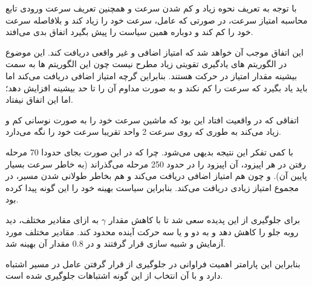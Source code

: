 با توجه به تعریف نحوه زیاد و کم شدن سرعت و همچنین تعریف سرعت ورودی تابع محاسبه امتیاز سرعت، در صورتی که عامل، سرعت خود را زیاد کند و بلافاصله سرعت خود را کم کند و دوباره همین سیاست را پیش بگیرد اتفاق بدی می‌افتد.

این اتفاق موجب آن خواهد شد که امتیاز اضافی و غیر واقعی دریافت کند. این موضوع در الگوریتم های یادگیری تقویتی زیاد مطرح نیست چون این الگوریتم ها به سمت بیشینه مقدار امتیاز در حرکت هستند. بنابراین گرچه امتیاز اضافی دریافت می‌کند اما باید یاد بگیرد که سرعت را کم نکند و به صورت مداوم آن را تا حد بیشینه افزایش دهد؛ اما این اتفاق نیفتاد.



اتفاقی که در واقعیت افتاد این بود که ماشین سرعت خود را به صورت نوسانی کم و زیاد می‌کند به طوری که روی سرعت 2 واحد تقریبا سرعت خود را نگه می‌دارد. 

با کمی تفکر این نتیجه بدیهی می‌شود. چرا که در این صورت بجای حدودا 70 مرحله رفتن در هر اپیزود، آن اپیزود را در حدود 250 مرحله می‌گذراند (به خاطر سرعت بسیار پایین آن).  و چون هم امتیاز اضافی دریافت می‌کند و هم بخاطر طولانی شدن مسیر، در مجموع امتیاز زیادی دریافت می‌کند. بنابراین سیاست بهینه خود را این گونه پیدا کرده بود.

برای جلوگیری از این پدیده سعی شد تا با کاهش مقدار $\gamma$ به ازای مقادیر مختلف، دید روبه جلو را کاهش دهد و به دو و یا سه حرکت آینده محدود کند. مقادیر مختلف مورد آزمایش و شبیه سازی قرار گرفتند و در $0.8$ مقدار آن بهینه شد. 

بنابراین این پارامتر اهمیت فراوانی در جلوگیری از قرار گرفتن عامل در مسیر اشتباه دارد و با آن انتخاب از این گونه اشتباهات جلوگیری شده است.








